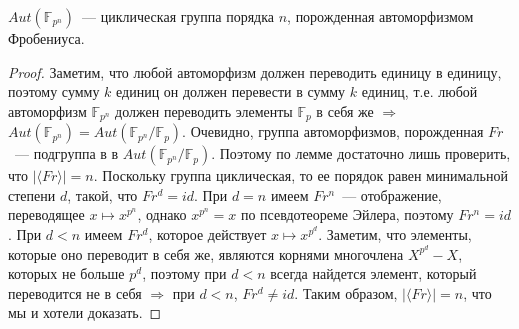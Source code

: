 \begin{theorem-non}
    $Aut(\mathbb{F}_{p^n})$~--- циклическая группа порядка $n$, порожденная автоморфизмом Фробениуса.
\end{theorem-non}
\begin{proof}
    Заметим, что любой автоморфизм должен переводить единицу в единицу, поэтому сумму $k$ единиц он должен перевести в сумму $k$ единиц, т.е. любой автоморфизм $\mathbb{F}_{p^n}$ должен переводить элементы $\mathbb{F}_p$ в себя же $\Rightarrow$ $Aut(\mathbb{F}_{p^n}) = Aut(\mathbb{F}_{p^n} / \mathbb{F}_p)$.
    Очевидно, группа автоморфизмов, порожденная $Fr$~--- подгруппа в в $Aut(\mathbb{F}_{p^n} / \mathbb{F}_p)$.
    Поэтому по лемме достаточно лишь проверить, что $|\langle Fr\rangle| = n$.
    Поскольку группа циклическая, то ее порядок равен минимальной степени $d$, такой, что $Fr^d=id$.
    При $d=n$ имеем $Fr^n$~--- отображение, переводящее $x \mapsto x^{p^n}$, однако $x^{p^n}=x$ по псевдотеореме Эйлера, поэтому $Fr^n = id$.
    При $d<n$ имеем $Fr^d$, которое действует $x \mapsto x^{p^d}$. 
    Заметим, что элементы, которые оно переводит в себя же, являются корнями многочлена $X^{p^d}-X$, которых не больше $p^d$, поэтому при $d<n$ всегда найдется элемент, который переводится не в себя $\Rightarrow$ при $d<n$, $Fr^d \neq id$.
    Таким образом, $|\langle Fr\rangle | = n$, что мы и хотели доказать.
\end{proof}

